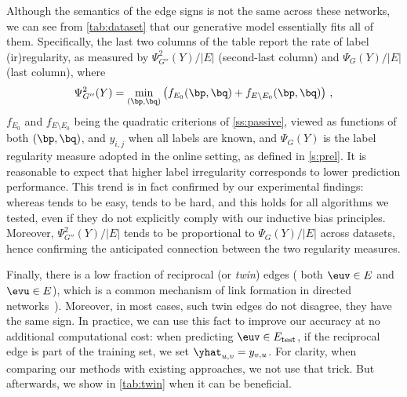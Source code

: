 Although the semantics of the edge signs is not the same across these networks, we can see from
\autoref{tab:dataset} that our generative model essentially fits all of them. Specifically, the last
two columns of the table report the rate of label (ir)regularity, as measured by
$\Psi^2_{G''}(Y)/|E|$ (second-last column) and $\Psi_{G}(Y)/|E|$ (last column), where 
\[
\Psi^2_{G''}(Y) = \min_{(\bp,\bq)} \left(f_{E_0}(\bp,\bq) + f_{E\setminus E_0}(\bp,\bq)\right)\,,
\]
$f_{E_0}$ and $f_{E\setminus E_0}$ being the quadratic criterions of \autoref{ss:passive}, viewed as
functions of both $(\bp,\bq)$, and $y_{i,j}$ when all labels are known, and $\Psi_{G}(Y)$ is the
label regularity measure adopted in the online setting, as defined in \autoref{s:prel}. It is
reasonable to expect that higher label irregularity corresponds to lower prediction performance.
This trend is in fact confirmed by our experimental findings: whereas \epi{} tends to be easy,
\aut{} tends to be hard, and this holds for all algorithms we tested, even if they do not explicitly
comply with our inductive bias principles. Moreover, $\Psi^2_{G''}(Y)/|E|$ tends to be proportional
to $\Psi_{G}(Y)/|E|$ across datasets, hence confirming the anticipated connection between the two
regularity measures.

\begin{newcontent}
Finally, there is a low fraction of reciprocal (or \emph{twin}) edges (\ie{} both $\euv \in E$ and $\evu
\in E$), which is a common mechanism of link formation in directed
networks~\autocites{DirectedReciprocity04}{Reciprocity13}). Moreover, in most cases, such twin edges do not disagree,
\ie{} they have the same sign. In practice, we can use this fact to improve our accuracy at no
additional computational cost: when predicting $\euv \in E_{\mathrm{test}}$, if the reciprocal edge
\evu{} is part of the training set, we set $\yhat_{u,v} = y_{v,u}$. For clarity, when comparing
our methods with existing approaches, we not use that trick. But afterwards, we show in
\autoref{tab:twin} when it can be beneficial.
\end{newcontent}

